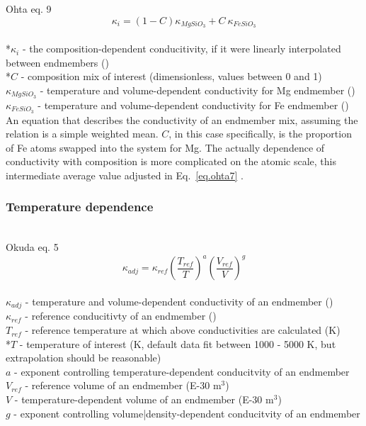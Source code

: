 Ohta eq. 9 
\begin{equation}%
\kappa_{i}=\left ( 1-C \right )\kappa_{MgSiO_{3}}+C\ \kappa_{FeSiO_{3}}
\label{eq.ohta9}
\end{equation}%
\\ *$\kappa_{i}$ - the composition-dependent conducitivity, if it were linearly interpolated between endmembers (\wmk)\\
*$C$ - composition mix of interest (dimensionless, values between 0 and 1)\\
$\kappa_{MgSiO_{3}}$ - temperature and volume-dependent conductivity for Mg endmember (\wmk)\\
$\kappa_{FeSiO_{3}}$ - temperature and volume-dependent conductivity for Fe endmember (\wmk)\\

An equation that describes the conductivity of an endmember mix, assuming the relation is a simple weighted mean. $C$, in this case specifically, is the proportion of Fe atoms swapped into the system for Mg. The actually dependence of conductivity with composition is more complicated on the atomic scale, this intermediate average value adjusted in Eq.~\ref{eq.ohta7} \citep[][Eq. 7]{Ohta2017}. \\

\subsubsection{Temperature dependence}

\cite{Okuda2017}\\

Okuda eq. 5 
\begin{equation}%
\kappa_{adj}=\kappa_{ref}\left ( \frac{T_{ref}}{T} \right )^{a}\left ( \frac{V_{ref}}{V} \right )^{g}
\label{eq.okuda5}
\end{equation}%
\\ $\kappa_{adj}$ - temperature and volume-dependent conductivity of an endmember (\wmk)\\
$\kappa_{ref}$ - reference conducitivty of an endmember (\wmk)\\
$T_{ref}$ - reference temperature at which above conductivities are calculated (K)\\
*$T$ - temperature of interest (K, default data fit between 1000 - 5000 K, but extrapolation should be reasonable)\\   
$a$ - exponent controlling temperature-dependent conducitvity of an endmember\\
$V_{ref}$ - reference volume of an endmember (E-30 m$^3$)\\
$V$ - temperature-dependent volume of an endmember (E-30 m$^3$)\\
$g$ - exponent controlling volume|density-dependent conducitvity of an endmember\\

